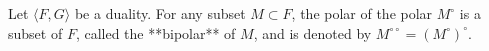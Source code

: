 Let $\langle F, G \rangle$ be a duality. For any subset $M \subset F$, the polar of the polar $M^\circ$ is a subset of $F$, called the **bipolar** of $M$, and is denoted by $M^{\circ\circ} = (M^\circ)^\circ$.
